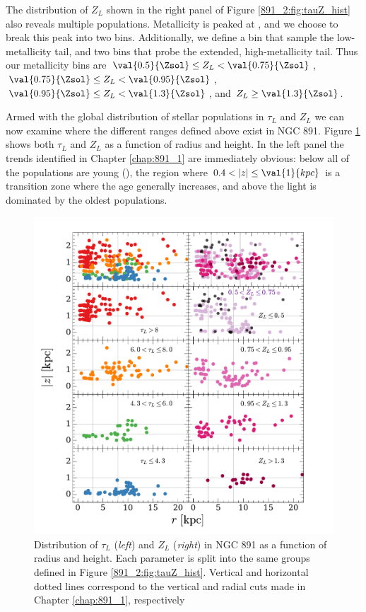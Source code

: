 The distribution of $Z_L$ shown in the right panel of Figure
\ref{891_2:fig:tauZ_hist} also reveals multiple
populations. Metallicity is peaked at , and we choose to
break this peak into two bins. Additionally, we define a bin that
sample the low-metallicity tail, and two bins that probe the extended,
high-metallicity tail. Thus our metallicity bins are
$\val{0.5}{\Zsol}\leq Z_L < \val{0.75}{\Zsol}$, $\val{0.75}{\Zsol}\leq
Z_L < \val{0.95}{\Zsol}$, $\val{0.95}{\Zsol}\leq Z_L <
\val{1.3}{\Zsol}$, and $Z_L \geq\val{1.3}{\Zsol}$.

Armed with the global distribution of stellar populations in $\tau_L$
and $Z_L$ we can now examine where the different ranges defined above
exist in NGC 891. Figure \ref{891_2:fig:rz_tZ} shows both $\tau_L$ and
$Z_L$ as a function of radius and height. In the left panel the trends
identified in Chapter \ref{chap:891_1} are immediately obvious: below
 all of the populations are young (),
the region where $0.4 < |z| \leq \val{1}{kpc}$ is a transition zone
where the age generally increases, and above  the light is
dominated by the oldest populations.

\begin{figure}
  \centering
  \includegraphics[width=\textwidth]{891_2/figs/rz_tZ.pdf}
  \caption[Distribution of $\tau_L$ and $Z_L$ as function of
    ($r,|z|$)]{\fixspacing\label{891_2:fig:rz_tZ}Distribution of
    $\tau_L$ (\emph{left}) and $Z_L$ (\emph{right}) in NGC 891 as a
    function of radius and height. Each parameter is split into the
    same groups defined in Figure \ref{891_2:fig:tauZ_hist}. Vertical
    and horizontal dotted lines correspond to the vertical and radial
    cuts made in Chapter \ref{chap:891_1}, respectively}
\end{figure}

